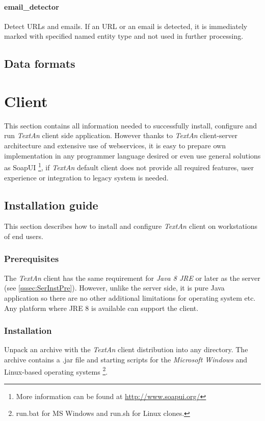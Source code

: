 \documentclass[12pt,a4paper]{report}
\newcommand{\textan}{\emph{TextAn}}
\begin{document}
\paragraph{email\_detector}
Detect URLs and emails. If an URL or an email is detected, it is immediately marked with specified named entity type and not used in further processing.

\subsection{Data formats}

\section{Client}

This section contains all information needed to successfully install, configure and run \textan{} client side application.
However thanks to \textan{} client-server architecture and extensive use of webservices,
it is easy to prepare own implementation in any programmer language desired or even use general solutions as SoapUI
\footnote{More information can be found at \url{http://www.soapui.org/}},
if \textan{} default client does not provide all required features, user experience or integration to legacy system is needed.

\subsection{Installation guide}

This section describes how to install and configure \textan{} client on workstations of end users.

\subsubsection{Prerequisites}

The \textan{} client has the same requirement for \emph{Java 8 JRE} or later as the server (see \ref{sssec:SerInstPre}).
However, unlike the server side, it is pure Java application so there are no other additional limitations for operating system etc.
Any platform where JRE 8 is available can support the client.

\subsubsection{Installation}

Unpack an archive with the \textan{} client distribution into any directory. 
The archive contains a .jar file and starting scripts for the \emph{Microsoft Windows} and Linux-based operating systems
\footnote{run.bat for MS Windows and run.sh for Linux clones.\label{runscript_note}}.
\end{document}
